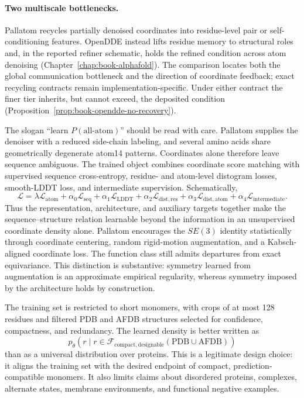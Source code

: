 \paragraph{Two multiscale bottlenecks.}
Pallatom recycles partially denoised coordinates into residue-level pair or self-conditioning
features.  OpenDDE instead lifts residue memory to structural roles and, in the reported refiner
schematic, holds the refined condition across atom denoising
(Chapter~\ref{chap:book-alphafold}).  The comparison locates both the global communication
bottleneck and the direction of coordinate feedback; exact recycling contracts remain
implementation-specific.  Under either contract the finer tier inherits, but cannot exceed, the
deposited condition (Proposition~\ref{prop:book-opendde-no-recovery}).

The slogan ``learn $P(\text{all-atom})$'' should be read with care.  Pallatom supplies the denoiser
with a reduced side-chain labeling, and several amino acids share geometrically degenerate atom14
patterns.  Coordinates alone therefore leave sequence ambiguous.  The trained
object combines coordinate score matching with supervised sequence cross-entropy, residue- and
atom-level distogram losses, smooth-LDDT loss, and intermediate supervision.  Schematically,
\begin{equation}
\mathcal L
=\lambda\mathcal L_{\mathrm{atom}}
+\alpha_0\mathcal L_{\mathrm{seq}}
+\alpha_1\mathcal L_{\mathrm{LDDT}}
+\alpha_2\mathcal L_{\mathrm{dist,res}}
+\alpha_3\mathcal L_{\mathrm{dist,atom}}
+\alpha_4\mathcal L_{\mathrm{intermediate}}.
\label{eq:pallatom-composite-loss}
\end{equation}
Thus the representation, architecture, and auxiliary targets together make the sequence--structure
relation learnable beyond the information in an unsupervised coordinate density alone.
Pallatom encourages the $SE(3)$ identity statistically through coordinate centering, random
rigid-motion augmentation, and a Kabsch-aligned coordinate loss.  The function class still admits
departures from exact equivariance.  This distinction
is substantive: symmetry learned from augmentation is an approximate empirical regularity,
whereas symmetry imposed by the architecture holds by construction.

The training set is restricted to short monomers, with crops of at most 128 residues and filtered
PDB and AFDB structures selected for confidence, compactness, and redundancy.  The learned density
is better written as
\begin{equation}
p_\theta\!\left(r\mid r\in\mathcal F_{\mathrm{compact,designable}}
(\mathrm{PDB}\cup\mathrm{AFDB})\right)
\label{eq:pallatom-curated-distribution}
\end{equation}
than as a universal distribution over proteins.  This is a legitimate design choice: it aligns
the training set with the desired endpoint of compact, prediction-compatible monomers.  It also
limits claims about disordered proteins, complexes, alternate states, membrane environments, and
functional negative examples.

